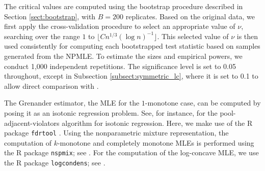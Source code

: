 \documentclass[12pt,letterpaper, twoside, openany]{article}
\theoremstyle{plain}
\begin{document}
The critical values are computed using the bootstrap procedure described in Section \ref{sect:bootstrap}, with $B = 200$ replicates. Based on the original data, we first apply the cross-validation procedure to select an appropriate value of $\nu$, searching over the range $1$ to $\lfloor Cn^{1/3}(\log n)^{-1} \rfloor$. This selected value of $\nu$ is then used consistently for computing each bootstrapped test statistic based on samples generated from the NPMLE.
To estimate the sizes and empirical powers, we conduct 1,000 independent repetitions. The significance level is set to 0.05 throughout, except in Subsection \ref{subsect:symmetric_lc}, where it is set to 0.1 to allow direct comparison with \cite{balabdaoui2018inference}.


The Grenander estimator, the MLE for the $1$-monotone case, can be computed by posing it as an isotonic regression problem. See, for instance, \cite{robertson1988order} for the pool-adjacent-violators algorithm for isotonic regression. Here, we make use of the R package \verb|fdrtool| \citep{fdrtoolR}. Using the nonparametric mixture representation, the computation of $k$-monotone and completely monotone MLEs is performed using the R package \verb|nspmix|; see \cite{wang2007fast}. For the computation of the log-concave MLE, we use the R package \verb|logcondens|; see \cite{dumbgen2011logcondens}.
\end{document}
